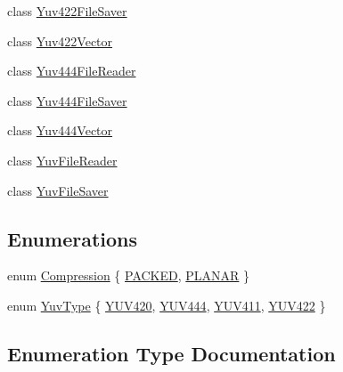 \begin{DoxyCompactItemize}
\item 
class \hyperlink{classUtility_1_1Yuv422FileSaver}{Yuv422\+File\+Saver}
\item 
class \hyperlink{classUtility_1_1Yuv422Vector}{Yuv422\+Vector}
\item 
class \hyperlink{classUtility_1_1Yuv444FileReader}{Yuv444\+File\+Reader}
\item 
class \hyperlink{classUtility_1_1Yuv444FileSaver}{Yuv444\+File\+Saver}
\item 
class \hyperlink{classUtility_1_1Yuv444Vector}{Yuv444\+Vector}
\item 
class \hyperlink{classUtility_1_1YuvFileReader}{Yuv\+File\+Reader}
\item 
class \hyperlink{classUtility_1_1YuvFileSaver}{Yuv\+File\+Saver}
\end{DoxyCompactItemize}
\subsection*{Enumerations}
\begin{DoxyCompactItemize}
\item 
enum \hyperlink{namespaceUtility_a56a83bf6847f4801f4205eb4be237ccf}{Compression} \{ \hyperlink{namespaceUtility_a56a83bf6847f4801f4205eb4be237ccfa8f626cb9c789e0dd4b7c9dad49465938}{P\+A\+C\+K\+E\+D}, 
\hyperlink{namespaceUtility_a56a83bf6847f4801f4205eb4be237ccfa50babda0470ecef96fd4d586825f0c7c}{P\+L\+A\+N\+A\+R}
 \}
\item 
enum \hyperlink{namespaceUtility_a390030b1bf5fed79ccf00774d4e1b5b1}{Yuv\+Type} \{ \hyperlink{namespaceUtility_a390030b1bf5fed79ccf00774d4e1b5b1acb52b4d8e199d901af27ee1f2d6bcb04}{Y\+U\+V420}, 
\hyperlink{namespaceUtility_a390030b1bf5fed79ccf00774d4e1b5b1a523b094e008f914e9e01af828090df0c}{Y\+U\+V444}, 
\hyperlink{namespaceUtility_a390030b1bf5fed79ccf00774d4e1b5b1a74f2a458ec2ec843a0ce367142039045}{Y\+U\+V411}, 
\hyperlink{namespaceUtility_a390030b1bf5fed79ccf00774d4e1b5b1af95cc5446c6345daadf349ccd299a2f5}{Y\+U\+V422}
 \}
\end{DoxyCompactItemize}


\subsection{Enumeration Type Documentation}
\hypertarget{namespaceUtility_a56a83bf6847f4801f4205eb4be237ccf}{}
